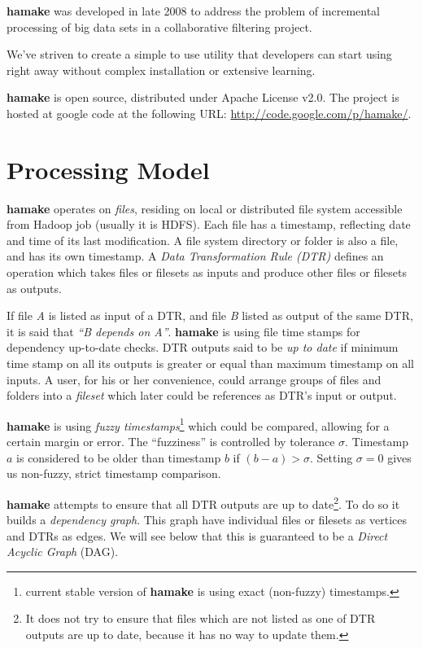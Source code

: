 \documentclass[10pt,conference,letterpaper]{IEEEtran}
\begin{document}
\textbf{hamake} was developed in late 2008 to address the problem of
incremental processing of big data sets in a collaborative filtering
project.

We've striven to create a simple to use utility that developers can
start using right away without complex installation or extensive
learning. 

\textbf{hamake} is open source, distributed under Apache
License v2.0. The project is hosted at google code at the following
URL: \url{http://code.google.com/p/hamake/}.

\section{Processing Model}

\textbf{hamake} operates on \textit{files}, residing on local or
distributed file system accessible from Hadoop job (usually it is
HDFS). Each file has a timestamp, reflecting date and time of its last
modification. A file system directory or folder is also a file, and
has its own timestamp. A \textit{Data Transformation Rule (DTR)}
defines an operation which takes files or filesets as inputs and
produce other files or filesets as outputs.

If file \textit{A} is listed as input of a DTR, and file \textit{B}
listed as output of the same DTR, it is said that \textit{``B depends
  on A''}. \textbf{hamake} is using file time stamps for dependency
up-to-date checks. DTR outputs said to be \textit{up to date} if
minimum time stamp on all its outputs is greater or equal than maximum
timestamp on all inputs. A user, for his or her convenience, could
arrange groups of files and folders into a \emph{fileset} which later
could be references as DTR's input or output.

\textbf{hamake} is using \textit{fuzzy timestamps}\footnote{current stable
  version of \textbf{hamake} is using exact (non-fuzzy) timestamps.}
which could be compared, allowing for a certain margin or error. The
``fuzziness'' is controlled by tolerance $\sigma$. Timestamp $a$ is
considered to be older than timestamp $b$ if $(b-a)>\sigma$. Setting
$\sigma=0$ gives us non-fuzzy, strict timestamp comparison.

\textbf{hamake} attempts to ensure that all DTR outputs are up to
date\footnote{It does not try to ensure that files which are not
  listed as one of DTR outputs are up to date, because it has no way
  to update them.}.  To do so it builds a \textit{dependency
  graph}. This graph have individual files or filesets as vertices and
DTRs as edges. We will see below that this is guaranteed to be a
\textit{Direct Acyclic Graph} (DAG).
\end{document}
